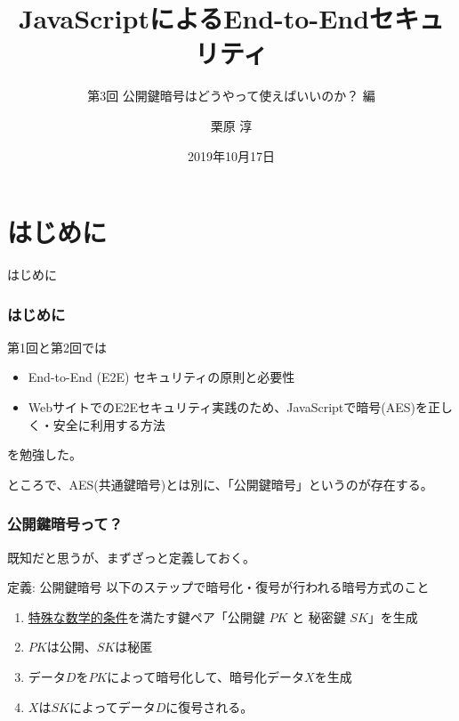 \documentclass[12pt,dvipdfmx]{beamer}
\title[E2E Security with JS 03]{JavaScriptによるEnd-to-Endセキュリティ}
\subtitle{第3回 公開鍵暗号はどうやって使えばいいのか？ 編}
\author[Jun Kurihara]{栗原 淳}
\institute[]{}
\date[Oct. 17, 2019]{2019年10月17日}
\begin{document}
\begin{frame}
\titlepage
\end{frame}

\section{はじめに}
\begin{frame}
 \centering
 {\Large はじめに}
\end{frame}

\begin{frame}
\frametitle{はじめに}
第1回と第2回では
\begin{itemize}
 \item End-to-End (E2E) セキュリティの原則と必要性
 \item WebサイトでのE2Eセキュリティ実践のため、JavaScriptで暗号(AES)を正しく・安全に利用する方法
\end{itemize}
を勉強した。


\vspace{2ex}

ところで、AES(共通鍵暗号)とは別に、「公開鍵暗号」というのが存在する。
\end{frame}

\begin{frame}
\frametitle{公開鍵暗号って？}

既知だと思うが、まずざっと定義しておく。

\begin{block}{\small 定義: 公開鍵暗号}
\footnotesize
以下のステップで暗号化・復号が行われる暗号方式のこと
\begin{enumerate}
 \item \underline{特殊な数学的条件}を満たす鍵ペア「公開鍵 $\mathit{PK}$ と 秘密鍵 $\mathit{SK}$」を生成
 \item \alert{$\mathit{PK}$は公開、$\mathit{SK}$は秘匿}
 \item データ$D$を$\mathit{PK}$によって暗号化して、暗号化データ$X$を生成
 \item $X$は$\mathit{SK}$によってデータ$D$に復号される。
\end{enumerate}
\end{block}
\end{frame}
\end{document}
